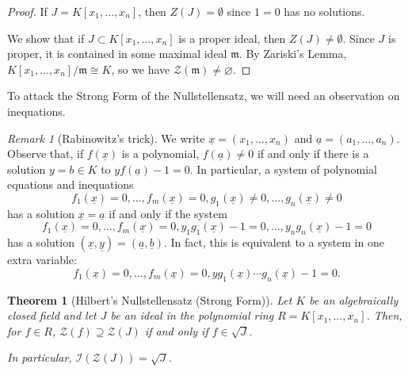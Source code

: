\documentclass{amsart}[12pt]
\newcommand{\va}{\underline{a}}
\newcommand{\vx}{\underline{x}}
\newcommand{\vy}{\underline{y}}
\newcommand{\cZ}{\mathcal{Z}}
\newcommand{\cI}{\mathcal{I}}
\newcommand{\fm}{{\mathfrak m}}
\numberwithin{equation}{section}
\theoremstyle{plain} %
\newtheorem{thm}[equation]{Theorem}
\theoremstyle{definition}
\theoremstyle{remark}
\newtheorem{rem}[equation]{Remark}
\newtheorem{remark}[equation]{Remark}
\def\va{\underline{a}}
\begin{document}
\begin{proof} If $J = K[x_1, \dots, x_n]$, then $Z(J) = \emptyset$ since $1 = 0$ has no solutions.


We show that if $J \subset K[x_1, \dots, x_n]$ is a proper ideal, then $Z(J) \ne \emptyset$. Since $J$ is proper, it is contained in some maximal ideal $\fm$. By Zariski's Lemma, $K[x_1,\dots,x_n]/\fm\cong K$,  so we have $\cZ(\fm) \neq \varnothing$.
\end{proof}



 To attack the Strong Form of the Nullstellensatz, we will need an observation on inequations. 
 
 \begin{remark}[Rabinowitz's trick]
 \label{rk:Rabinowitz}
 We write $\vx=(x_1,\dots,x_n)$ and $\va=(a_1,\dots,a_n)$. Observe that, if $f(\vx)$ is a polynomial, $f(\va)\neq 0$ if and only if there is a solution $y=b\in K$ to $yf(\va)-1=0$. In particular, a system of polynomial equations and inequations
\begin{equation*}
f_1(\vx)=0, \dots, f_m(\vx)=0, g_1(\vx)\neq0,\dots, g_n(\vx)\neq 0
\end{equation*}
has a solution $\vx=\va$ if and only if the system
\begin{equation*}
 f_1(\vx)=0, \dots, f_m(\vx)=0, y_1 g_1(\vx)-1=0,\dots, y_n g_n(\vx)-1 = 0
\end{equation*}
has a solution $(\vx,\vy)=(\va,\underline{b})$. In fact, this is equivalent to a system in one extra variable:
\begin{equation*}
f_1(\vx)=0, \dots, f_m(\vx)=0, y g_1(\vx)\cdots g_n(\vx)-1 = 0.
\end{equation*}
\end{remark}

\begin{thm}[Hilbert's Nullstellensatz (Strong Form)] Let $K$ be an algebraically closed field and 
let $J$ be an ideal in the polynomial ring $R=K[x_1, \dots, x_n]$. Then, for $f\in R$, 
$\cZ(f) \supseteq \cZ(J)$ if and only if $f\in \sqrt{J}$.

In particular, $\cI(\cZ(J)) = \sqrt{J}$.
\end{thm}

\end{document}
